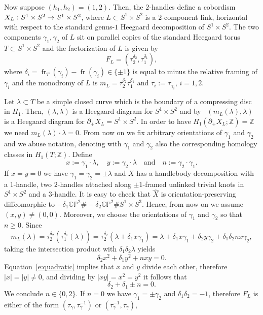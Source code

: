 \documentclass[11pt,a4paper]{amsart}
\newcommand{\CP}{\mathbb{CP}}
\newcommand{\Z}{\mathbb Z}
\newcommand{\de}{\delta}
\newcommand{\ga}{\gamma}
\newcommand{\la}{\lambda}
\newcommand{\x}{\times}
\newcommand{\del}{\partial}
\newcommand{\co}{\thinspace\colon}
\DeclareMathOperator{\fr}{fr}
\theoremstyle{definition}
\numberwithin{equation}{section}
\begin{document}
Now suppose $(h_1,h_2)=(1,2)$. Then, the $2$-handles define a cobordism $X_L\co S^1\x S^2\to S^1\x S^2$, 
where $L\subset S^1\x S^2$ is a $2$-component link, horizontal with respect to the standard genus-$1$ 
Heegaard decomposition of $S^1\x S^2$. The two components $\ga_1, \ga_2$ of $L$ sit on parallel copies 
of the standard Heegaard torus $T\subset S^1\x S^2$ and the factorization of $L$ is given by 
\begin{equation}\label{e:2factor}
F_L = (\tau_2^{\de_2},\tau_1^{\de_1}), 
\end{equation}
where $\de_i = \fr_T(\ga_i) - \fr(\ga_i)\in\{\pm 1\}$ is equal to minus the relative framing of $\ga_i$ and the monodromy of $L$ is $m_L = \tau_2^{\de_2}\tau_1^{\de_1}$ and $\tau_i := \tau_{\ga_i}$, $i=1,2$.

Let $\la\subset T$ be a simple closed curve which is the boundary of a compressing disc in $H_1$. 
Then, $(\la,\la)$ is a Heegaard diagram for $S^1\x S^2$ and by~\cite[Lemma~3.3]{LP22-2} $(m_L(\la),\la)$ is a Heegaard 
diagram for $\del_+ X_L = S^1\x S^2$. In order to have $H_1(\del_+ X_L;\Z)=\Z$ we need 
$m_L(\la)\cdot\la =0$. From now on we fix arbitrary
orientations of $\ga_1$ and $\ga_2$ and we abuse notation, 
denoting with $\ga_1$ and $\ga_2$ also 
the corresponding homology classes in $H_1(T;\Z)$. Define 
\[
x := \ga_1\cdot\la,\quad y := \ga_2\cdot\la\quad\text{and}\quad n := \ga_2\cdot\ga_1.
\]
If $x=y=0$ we have $\ga_1=\ga_2=\pm\la$ and $X$ has a handlebody decomposition 
with a $1$-handle, two $2$-handles attached along $\pm 1$-framed unlinked trivial knots in 
$S^1\x S^2$ and a $3$-handle. It is easy to check that $\hat X$ is orientation-preserving diffeomorphic 
to $-\de_1\CP^2\#-\de_2\CP^2\# S^1\x S^3$. Hence, from 
now on we assume $(x,y)\neq (0,0)$. Moreover, we choose the orientations of $\ga_1$ and $\ga_2$
so that $n\geq 0$. Since 
\[
m_L(\la) = \tau_2^{\de_2}(\tau_1^{\de_1}(\la)) = 
\tau_2^{\de_2}(\la + \de_1 x \ga_1) = 
\la + \de_1 x \ga_1 + \de_2 y \ga_2 + \de_1\de_2 n x \ga_2, 
\]
taking the intersection product with $\de_1\de_2\la$ yields  
\begin{equation}\label{e:quadratic} 
\de_2 x^2 + \de_1 y^2 + nxy = 0.
\end{equation}
Equation~\eqref{e:quadratic} implies that $x$ and $y$ divide each other, 
therefore $|x|=|y|\neq 0$, and dividing by $|xy| = x^2 = y^2$ it follows that 
\[
\de_2 + \de_1 \pm n = 0.
\]
We conclude $n\in\{0,2\}$. If $n=0$ we have $\ga_1=\pm\ga_2$ and $\de_1\de_2=-1$, 
therefore $F_L$ is either of the form $(\tau_\ga,\tau_\ga^{-1})$ or $(\tau_\ga^{-1},\tau_\ga)$, 
\end{document}
